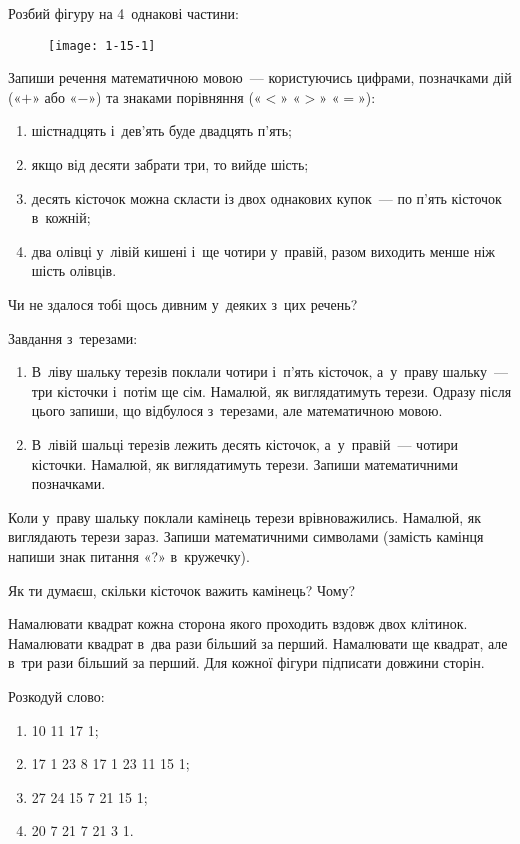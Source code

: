 \problem
Розбий фігуру на 4~однакові частини:

\begin{figure}[h]
    \centering
    \texttt{[image: 1-15-1]}
\end{figure}


\problem
Запиши речення математичною мовою~--- користуючись цифрами,
позначками дій («$+$» або «$-$») та знаками порівняння («$<$» «$>$» «$=$»):
\begin{enumerate}
    \item шістнадцять і~дев'ять буде двадцять п'ять;
    \item якщо від десяти забрати три, то вийде шість;
    \item десять кісточок можна скласти із двох однакових купок~--- 
    по п'ять кісточок в~кожній;
    \item два олівці у~лівій кишені і~ще чотири у~правій,
    разом виходить менше ніж шість олівців.
\end{enumerate}
Чи не здалося тобі щось дивним у~деяких з~цих речень?

\problem
Завдання з~терезами:
\begin{enumerate}
    \item В~ліву шальку терезів поклали чотири і~п'ять кісточок,
    а~у~праву шальку~--- три кісточки і~потім ще сім.
    Намалюй, як виглядатимуть терези.
    Одразу після цього запиши, що відбулося з~терезами,
    але математичною мовою.
    \item В~лівій шальці терезів лежить десять кісточок,
    а~у~правій~--- чотири кісточки.
    Намалюй, як виглядатимуть терези. Запиши математичними позначками.
\end{enumerate}

Коли у~праву шальку поклали камінець терези врівноважились.
Намалюй, як виглядають терези зараз.
Запиши математичними символами
(замість камінця напиши знак питання «?» в~кружечку).

Як ти думаєш, скільки кісточок важить камінець? Чому?


\problem
Намалювати квадрат кожна сторона якого проходить вздовж двох клітинок.
Намалювати квадрат в~два рази більший за перший.
Намалювати ще квадрат, але в~три рази більший за перший.
Для кожної фігури підписати довжини сторін.


\problem
Розкодуй слово:
\begin{enumerate}
    \item 10 11 17 1; 
    \item 17 1 23 8 17 1 23 11 15 1;
    \item 27 24 15 7 21 15 1;
    \item 20 7 21 7 21 3 1.
\end{enumerate}

